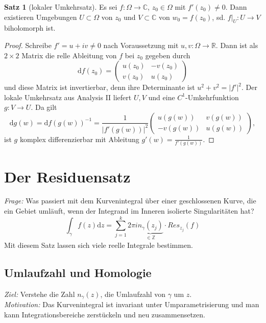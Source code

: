 \documentclass[11pt,titlepage]{article}
\theoremstyle{definition}
\newtheorem{theorem}{Satz}[section]
\theoremstyle{remark}
\begin{document}
	\begin{theorem}[lokaler Umkehrsatz]
		Es sei $f:\Omega\to\mathbb{C}$, $z_0\in\Omega$ mit $f'(z_0)\neq 0$. Dann existieren 
		Umgebungen $U\subset\Omega$ von $z_0$ und $V\subset\mathbb{C}$ von $w_0=f(z_0)$, 
		sd. $f|_U :U\to V$ biholomorph ist.
	\end{theorem}
	
	\begin{proof}
		Schreibe $f'=u+iv \neq 0$ nach Voraussetzung mit $u,v:\Omega\to\mathbb{R}$. Dann ist 
		als $2\times 2$ Matrix die relle Ableitung von $f$ bei $z_0$ gegeben durch 
		\[ \mathrm{d}f(z_0) =\begin{pmatrix} u(z_0)&-v(z_0)\\v(z_0)&u(z_0)\end{pmatrix} \]
		und diese Matrix ist invertierbar, denn ihre Determinante ist $u^2 +v^2 =|f'|^2$. 
		Der lokale Umkehrsatz aus Analysis II liefert $U,V$ und eine $C^1$-Umkehrfunktion 
		$g:V\to U$. Da gilt
		\[ \mathrm{d}g(w) =\mathrm{d} f(g(w))^{-1} =\frac{1}{|f'(g(w))|^2} 
		\begin{pmatrix} u(g(w))&v(g(w))\\-v(g(w))&u(g(w))\end{pmatrix}, \]
		ist $g$ komplex differenzierbar mit Ableitung $g'(w)=\frac{1}{f'(g(w))}$.
	\end{proof}
	
	\section{Der Residuensatz}
	
	\textsl{Frage:} Was passiert mit dem Kurvenintegral über einer geschlossenen Kurve, die ein Gebiet 
	umläuft, wenn der Integrand im Inneren isolierte Singularitäten hat?
	\[ \int_{\gamma} f(z)\mathrm{d}z =\sum_{j=1}^k 2\pi i \underbrace{n_{\gamma}(z_j)}_{\in\mathbb{Z}}
	\cdot Res_{z_j}(f) \]
	Mit diesem Satz lassen sich viele reelle Integrale bestimmen.
	
	\subsection{Umlaufzahl und Homologie}
	
	\textsl{Ziel:} Verstehe die Zahl $n_{\gamma}(z)$, die Umlaufzahl von $\gamma$ um $z$. \\
	\textsl{Motivation:} Das Kurvenintegral ist invariant unter Umparametrisierung und man kann 
	Integrationsbereiche zerstückeln und neu zusammensetzen.
	
\end{document}
